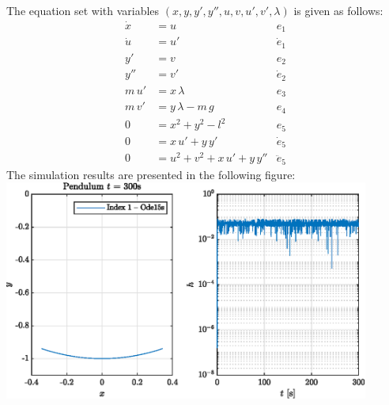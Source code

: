 The equation set with variables $(x,y,y',y'',u,v,u',v',\lambda)$ is given as follows:
\begin{align*}
	\dot x &= u & e_1\\
	\dot u &= u' & \dot e_1\\
	y' &= v & e_2\\
	y'' &= v' & \dot e_2\\
	m\,u' &= x\,\lambda & e_3\\
	m\,v' &= y\,\lambda - m\,g & e_4\\
	0 &= x^2 + y^2 - l^2 & e_5\\
	0 &= x\,u'+ y\,y' & \dot e_5 \\
	0 &= u^2 + v^2 + x\,u' + y\,y'' & \ddot e_5
\end{align*}
The simulation results are presented in the following figure:\\
\includegraphics[width=0.9\textwidth]{Figures/Ugf2_30.eps}

